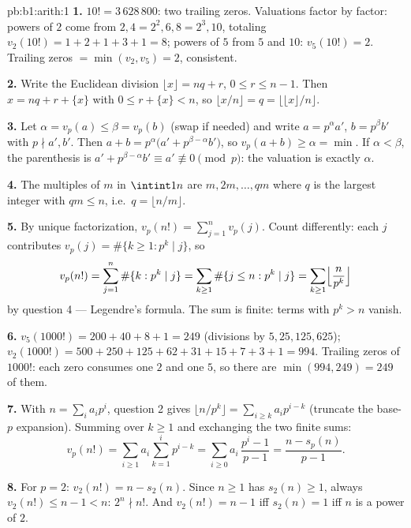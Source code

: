 \begin{solution}{pb:b1:arith:1}
\textbf{1.} $10! = 3\,628\,800$: two trailing zeros. Valuations
factor by factor: powers of $2$ come from $2, 4 = 2^2, 6, 8 = 2^3,
10$, totaling $v_2(10!) = 1 + 2 + 1 + 3 + 1 = 8$; powers of $5$
from $5$ and $10$: $v_5(10!) = 2$. Trailing zeros $=
\min(v_2, v_5) = 2$, consistent.

\textbf{2.} Write the Euclidean division $\lfloor x\rfloor = nq +
r$, $0 \leq r \leq n - 1$. Then $x = nq + r + \{x\}$ with $0 \leq
r + \{x\} < n$, so $\lfloor x/n \rfloor = q = \bigl\lfloor \lfloor
x \rfloor / n \bigr\rfloor$.

\textbf{3.} Let $\alpha = v_p(a) \leq \beta = v_p(b)$ (swap if
needed) and write $a = p^\alpha a'$, $b = p^\beta b'$ with $p
\nmid a', b'$. Then $a + b = p^\alpha\bigl(a' + p^{\beta -
\alpha}b'\bigr)$, so $v_p(a + b) \geq \alpha = \min$. If $\alpha <
\beta$, the parenthesis is $a' + p^{\beta-\alpha}b' \equiv a'
\not\equiv 0 \pmod p$: the valuation is exactly $\alpha$.

\textbf{4.} The multiples of $m$ in $\intint1n$ are $m, 2m, \dots,
qm$ where $q$ is the largest integer with $qm \leq n$, i.e.\ $q =
\lfloor n/m \rfloor$.

\textbf{5.} By unique factorization, $v_p(n!) = \sum_{j=1}^{n}
v_p(j)$. Count differently: each $j$ contributes $v_p(j) =
\#\{k \geq 1 : p^k \mid j\}$, so
\[
v_p(n!) = \sum_{j=1}^n \#\{k : p^k \mid j\}
= \sum_{k\geq1} \#\{j \leq n : p^k \mid j\}
= \sum_{k\geq1} \Bigl\lfloor \frac n{p^k} \Bigr\rfloor
\]
by question 4 --- Legendre's formula. The sum is finite: terms
with $p^k > n$ vanish.

\textbf{6.} $v_5(1000!) = 200 + 40 + 8 + 1 = 249$ (divisions by
$5, 25, 125, 625$); $v_2(1000!) = 500 + 250 + 125 + 62 + 31 + 15 +
7 + 3 + 1 = 994$. Trailing zeros of $1000!$: each zero consumes
one $2$ and one $5$, so there are $\min(994, 249) = 249$ of them.

\textbf{7.} With $n = \sum_i a_ip^i$, question 2 gives $\lfloor
n/p^k \rfloor = \sum_{i \geq k} a_ip^{i-k}$ (truncate the base-$p$
expansion). Summing over $k \geq 1$ and exchanging the two finite
sums:
\[
v_p(n!) = \sum_{i\geq1} a_i \sum_{k=1}^{i} p^{i-k}
= \sum_{i\geq0} a_i\,\frac{p^i - 1}{p - 1}
= \frac{n - s_p(n)}{p - 1} .
\]

\textbf{8.} For $p = 2$: $v_2(n!) = n - s_2(n)$. Since $n \geq 1$
has $s_2(n) \geq 1$, always $v_2(n!) \leq n - 1 < n$: $2^n \nmid
n!$. And $v_2(n!) = n - 1$ iff $s_2(n) = 1$ iff $n$ is a power of
$2$.


\end{solution}
